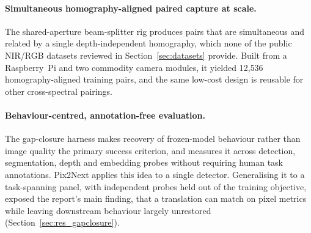 \paragraph{Simultaneous homography-aligned paired capture at scale.}
The shared-aperture beam-splitter rig produces pairs that are simultaneous and related by a single depth-independent homography, which none of the public NIR/RGB datasets reviewed in Section~\ref{sec:datasets} provide. Built from a Raspberry~Pi and two commodity camera modules, it yielded 12{,}536 homography-aligned training pairs, and the same low-cost design is reusable for other cross-spectral pairings.

\paragraph{Behaviour-centred, annotation-free evaluation.}
The gap-closure harness makes recovery of frozen-model behaviour rather than image quality the primary success criterion, and measures it across detection, segmentation, depth and embedding probes without requiring human task annotations. Pix2Next applies this idea to a single detector. Generalising it to a task-spanning panel, with independent probes held out of the training objective, exposed the report's main finding, that a translation can match on pixel metrics while leaving downstream behaviour largely unrestored (Section~\ref{sec:res_gapclosure}).


